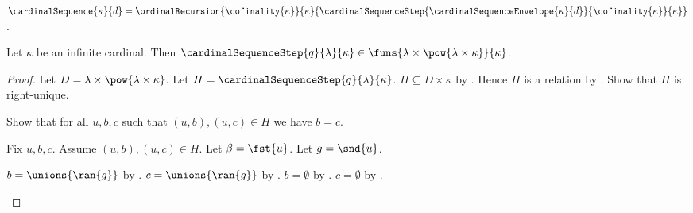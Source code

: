 \begin{definition}\label{cardinal_sequence}
    $\cardinalSequence{\kappa}{d}
        =\ordinalRecursion{\cofinality{\kappa}}{\kappa}
            {\cardinalSequenceStep{\cardinalSequenceEnvelope{\kappa}{d}}
                {\cofinality{\kappa}}{\kappa}}$.
\end{definition}

\begin{proposition}\label{cardinal_sequence_step_type}
    Let $\kappa$ be an infinite cardinal.
    Then $\cardinalSequenceStep{q}{\lambda}{\kappa}
        \in\funs{\lambda\times\pow{\lambda\times\kappa}}{\kappa}$.
\end{proposition}
\begin{proof}
    Let $D=\lambda\times\pow{\lambda\times\kappa}$.
    Let $H=\cardinalSequenceStep{q}{\lambda}{\kappa}$.
    $H\subseteq D\times\kappa$
        by .
    Hence $H$ is a relation
        by .
    Show that $H$ is right-unique.
    \begin{subproof}
        Show that for all $u,b,c$ such that $(u,b),(u,c)\in H$
            we have $b=c$.
        \begin{subproof}
            Fix $u,b,c$.
            Assume $(u,b),(u,c)\in H$.
            Let $\beta=\fst{u}$.
            Let $g=\snd{u}$.
            \begin{byCase}
                    \begin{byCase}
                            $b=\unions{\ran{g}}$ by
                                .
                            $c=\unions{\ran{g}}$ by
                                .
                            $b=\emptyset$ by
                                .
                            $c=\emptyset$ by
                                .
                    \end{byCase}
                    \begin{byCase}

\end{byCase}
\end{byCase}
\end{subproof}
\end{subproof}
\end{proof}
